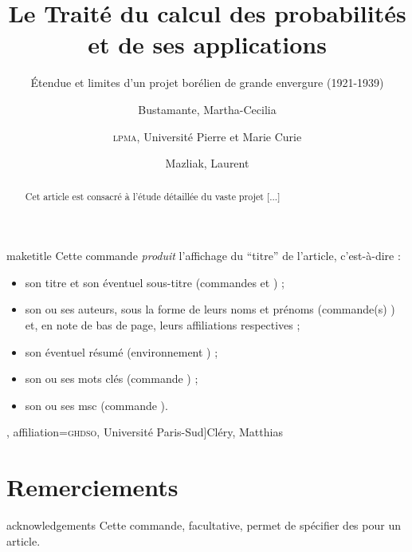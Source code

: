 \documentclass[english,nolocaltoc]{nwejmart}
\newtheorem[style=definition]{fait}
\newtheorem[title=expérience]{experience}
\newtheorem[title-plural=anneaux]{anneau}
\newtheorem[title=idéal,title-plural=idéaux]{ideal}
\begin{document}
\begin{docCommand}[doc description=\mandatory]{maketitle}{}
  Cette commande \emph{produit} l'affichage du \enquote{titre} de l'article,
  c'est-à-dire :
  \begin{itemize}
  \item son titre et son éventuel sous-titre (commandes  et
    ) ;
  \item son ou ses auteurs, sous la forme de leurs noms et prénoms (commande(s)
    ) et, en note de bas de page, leurs affiliations respectives ;
  \item son éventuel résumé (environnement ) ;
  \item son ou ses mots clés (commande ) ;
  \item son ou ses \acrshort{msc} (commande ).
  \end{itemize}
\end{docCommand}

\begin{bodycode}[listing options={deletekeywords={[2]title,article},deletekeywords={[5]keywords}}]
\title[Le Traité du calcul des probabilités]{Le Traité du calcul des
  probabilités et de ses applications}
\subtitle[Étendue et limites d'un projet borélien]{Étendue et limites
  d'un projet borélien de grande envergure (1921-1939)}
%
\author[
  affiliation={Laboratoire \textsc{sphere}, Université Paris Diderot}
  ]{Bustamante, Martha-Cecilia}
\author[
  affiliation=[aff2]{\textsc{lpma}, Université Pierre et Marie Curie},
  affiliation={\textsc{ghdso}, Université Paris-Sud}]{Cléry, Matthias}
\author[
  affiliationtagged={aff2}
]{Mazliak, Laurent}
%
\begin{abstract}
  Cet article est consacré à l'étude détaillée du vaste projet [...]
\end{abstract}
%
%
\maketitle
\end{bodycode}

\section{Remerciements}
\label{sec:remerciements}

\begin{docCommand}{acknowledgements}{}
  Cette commande, facultative, permet de spécifier des  pour
  un article.
\end{docCommand}
\end{document}
